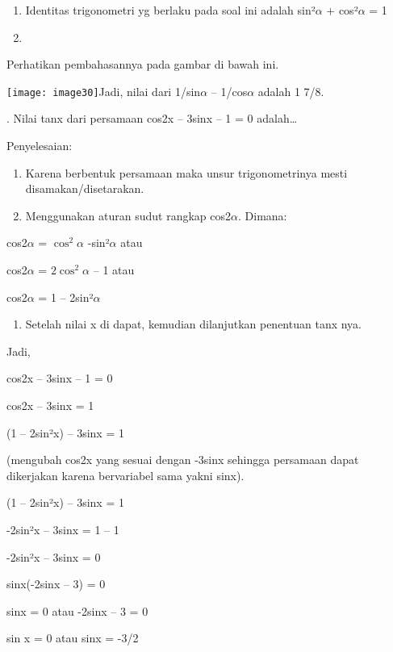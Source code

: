 \documentclass[11pt,fleqn]{book} %
\begin{document}
\begin{myEnumerate}
\begin{itemize}
\begin{enumerate}
\item  Identitas trigonometri yg berlaku pada soal ini adalah sin²$\alpha$ + cos²$\alpha$ = 1

\item  
\end{enumerate}

\noindent Perhatikan pembahasannya pada gambar di bawah ini.

\noindent \texttt{[image: image30]}Jadi, nilai dari 1/sin$\alpha$ -- 1/cos$\alpha$ adalah 1 7/8.

. Nilai tanx dari persamaan cos2x -- 3sinx -- 1 = 0 adalah{\dots}

\noindent Penyelesaian:

\begin{enumerate}
\item  Karena berbentuk persamaan maka unsur trigonometrinya mesti disamakan/disetarakan.

\item  Menggunakan aturan sudut rangkap cos2$\alpha$. Dimana:
\end{enumerate}

\noindent cos2$\alpha$ = $\cos^2\alpha$ -sin²$\alpha$ atau

\noindent cos2$\alpha$ = $2\cos^2\alpha$ -- 1 atau

\noindent cos2$\alpha$ = 1 -- 2sin²$\alpha$

\begin{enumerate}
\item  Setelah nilai x di dapat, kemudian dilanjutkan penentuan tanx nya.
\end{enumerate}

\noindent Jadi,

\noindent cos2x -- 3sinx -- 1 = 0

\noindent cos2x -- 3sinx = 1

\noindent (1 -- 2sin²x) -- 3sinx = 1

\noindent (mengubah cos2x yang sesuai dengan -3sinx sehingga persamaan dapat dikerjakan karena bervariabel sama yakni sinx).

\noindent (1 -- 2sin²x) -- 3sinx = 1

\noindent -2sin²x -- 3sinx = 1 -- 1

\noindent -2sin²x -- 3sinx = 0

\noindent sinx(-2sinx -- 3) = 0

\noindent sinx = 0 atau -2sinx -- 3 = 0

\noindent sin x = 0 atau sinx = -3/2


\end{itemize}
\end{myEnumerate}
\end{document}
